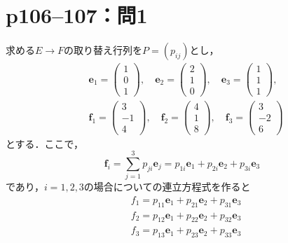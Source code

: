 \documentclass[a4paper,10pt,fleqn]{ltjsarticle}
\begin{document}
\newpage


\section*{p106--107：問1}
\begin{leftbar}
  求める$E\to F$の取り替え行列を$P=(p_{ij})$とし，
  \begin{align*}
     & \bm{e}_1=
    \begin{pmatrix}
      1 \\
      0 \\
      1
    \end{pmatrix}
    ,\quad
    \bm{e}_2=
    \begin{pmatrix}
      2 \\
      1 \\
      0
    \end{pmatrix}
    ,\quad
    \bm{e}_3=
    \begin{pmatrix}
      1 \\
      1 \\
      1
    \end{pmatrix}
    ,            \\
     &
    \bm{f}_1=
    \begin{pmatrix}
      3  \\
      -1 \\
      4
    \end{pmatrix}
    ,\quad
    \bm{f}_2=
    \begin{pmatrix}
      4 \\
      1 \\
      8
    \end{pmatrix}
    ,\quad
    \bm{f}_3=
    \begin{pmatrix}
      3  \\
      -2 \\
      6
    \end{pmatrix}
  \end{align*}
  とする．ここで，
  \[
    \bm{f}_i=\sum^{3}_{j=1}p_{ji}\bm{e}_{j}=p_{1i}\bm{e}_1+p_{2i}\bm{e}_2+p_{3i}\bm{e}_3
  \]
  であり，$i=1,2,3$の場合についての連立方程式を作ると
  \begin{align*}
     & f_1=p_{11}\bm{e}_1+p_{21}\bm{e}_2+p_{31}\bm{e}_3 \\
     & f_2=p_{12}\bm{e}_1+p_{22}\bm{e}_2+p_{32}\bm{e}_3 \\
     & f_3=p_{13}\bm{e}_1+p_{23}\bm{e}_2+p_{33}\bm{e}_3
  \end{align*}

\end{leftbar}
\end{document}
